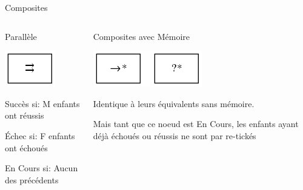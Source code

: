 \documentclass[presentation]{beamer}
\begin{document}
\begin{frame}[label=sec-2-1-3]{Composites}
\begin{columns}
\begin{column}{0.5\textwidth}

\begin{center}
\alert{Parallèle}
\end{center}

\includegraphics[width=.9\linewidth]{img/Parallel.png}


Succès si:
M enfants ont réussis

Échec si:
F enfants ont échoués

En Cours si:
Aucun des précédents
\end{column}

\begin{column}{0.5\textwidth}

\begin{center}
\alert{Composites avec Mémoire}
\end{center}

\includegraphics[width=.9\linewidth]{img/Memories.png}

Identique à leurs équivalents sans mémoire.

Mais tant que ce noeud est En Cours, les enfants ayant déjà échoués ou réussis ne sont par re-tickés
\end{column}
\end{columns}
\end{frame}
\end{document}
